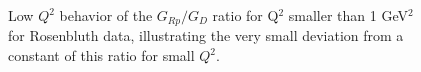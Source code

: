 \begin{figure}
\begin{center}
\caption{Low $Q^2$ behavior of the $G_{Rp}/G_D$ ratio for Q$^2$ smaller than 1 GeV$^2$ for Rosenbluth data, illustrating the very small deviation from a constant of this ratio for small $Q^2$.}
\label{fig:gepgd}
\end{center}
\end{figure}

